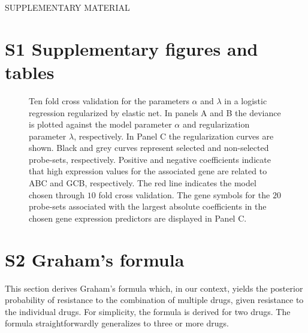 \documentclass{article}
\begin{document}
{}
\begin{center}
{\huge SUPPLEMENTARY MATERIAL}\bigskip \\
{\bf \hemaClassTitle{}}
\end{center}

\section*{S1 Supplementary figures and tables}

\begin{figure*}[htb]
\begin{center}
\end{center}
\caption{Ten fold cross validation for the parameters $\alpha$ and $\lambda$ in a logistic regression regularized by elastic net.
In panels A and B the deviance is plotted against the model parameter $\alpha$ and regularization parameter $\lambda$, respectively.
In Panel C the regularization curves are shown.
Black and grey curves represent selected and non-selected probe-sets, respectively.
Positive and negative coefficients indicate that high expression values for the associated gene are related to ABC and GCB, respectively.
The red line indicates the model chosen through $10$ fold cross validation.
The gene symbols for the $20$ probe-sets associated with the largest absolute coefficients in the chosen gene expression predictors are displayed in Panel C.}
\label{fig:crossval}
\end{figure*}







\clearpage



\section*{S2 Graham's formula}
\label{sec:graham}
This section derives Graham's formula which, in our context, yields the posterior probability of resistance to the combination of multiple drugs, given resistance to the individual drugs.
For simplicity, the formula is derived for two drugs.
The formula straightforwardly generalizes to three or more drugs.
\end{document}
